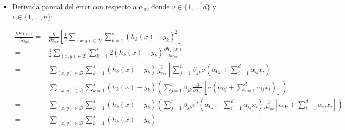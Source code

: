 \begin{itemize}
    \item Derivada parcial del error con respecto a $\alpha_{u v}$ donde $u \in \{1, \ldots, d\}$ y $v \in \{1, \ldots, n\}$:
    
    \begin{align} \label{eq:parcial_alpha_i}
        \frac{\partial E(h)}{\partial \alpha_{u v}} 
        =&
        \frac{\partial}{\partial \alpha_{u v}}
        \left[
            \frac{1}{2}
            \sum_{(x,y) \in \mathcal{D}}
            \sum_{k = 1}^s 
            \left(h_k(x) - y_k \right)^2
        \right]
        \\ %
        = &
        \frac{1}{2}
        \sum_{(x,y) \in \mathcal{D}}
        \sum_{k = 1}^s 
        2 \left(h_k(x) - y_k \right)
        \frac{\partial h_k(x)}{\partial \alpha_{u v}} 
        \\ 
        = & %
        \sum_{(x,y) \in \mathcal{D}}
        \sum_{k = 1}^s 
        \left(h_k(x) - y_k \right)
        \frac{\partial}{\partial \alpha_{u v}} 
        \left[
            \sum_{j = 1}^n 
                \beta_{j k}
                \sigma
                \left(  
                    \alpha_{0 j} +
                    \sum_{i=1}^d \alpha_{i j}x_i
                \right)
        \right] 
        \\ 
        = & %
        \sum_{(x,y) \in \mathcal{D}}
        \sum_{k = 1}^s 
        \left(h_k(x) - y_k \right)
        \left(
            \sum_{j = 1}^n 
            \beta_{j k}
            \frac{\partial}{\partial \alpha_{u v}} 
            \left[
                \sigma
                \left(  
                    \alpha_{0 j} +
                    \sum_{i=1}^d \alpha_{i j}x_i
                \right)
            \right]
        \right) 
        \\ 
        = & %
        \sum_{(x,y) \in \mathcal{D}}
        \sum_{k = 1}^s 
        \left(h_k(x) - y_k \right)
        \left(
            \sum_{j = 1}^n 
            \beta_{j k}
            \sigma '
            \left(  
                \alpha_{0 j} +
                \sum_{i=1}^d \alpha_{i j}x_i
            \right)
            \frac{\partial}{\partial \alpha_{u v}}    
            \left[
                \alpha_{0 j} +
                \sum_{i=1}^d \alpha_{i j}x_i
            \right]
        \right) 
        \\ 
        = & %
        \sum_{(x,y) \in \mathcal{D}}
        \sum_{k = 1}^s 
        \left(h_k(x) - y_k \right)

\end{align}
\end{itemize}
